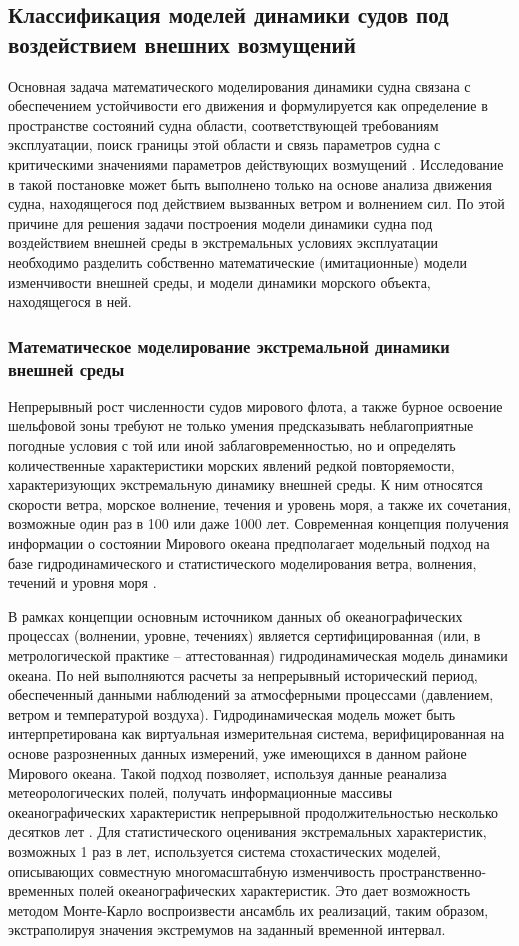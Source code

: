 \subsection{Классификация моделей динамики судов под воздействием внешних возмущений}
Основная задача математического моделирования динамики судна связана с обеспечением устойчивости его движения и формулируется как определение в пространстве состояний судна области, соответствующей требованиям эксплуатации, поиск границы этой области и связь параметров судна с критическими значениями параметров действующих возмущений \citep{dk1}. Исследование в такой постановке может быть выполнено только на основе анализа движения судна, находящегося под действием вызванных ветром и волнением сил. По этой причине для решения задачи построения модели динамики судна под воздействием внешней среды в экстремальных условиях эксплуатации необходимо разделить собственно математические (имитационные) модели изменчивости внешней среды, и модели динамики морского объекта, находящегося в ней.

\subsubsection{Математическое моделирование экстремальной динамики внешней среды}
Непрерывный рост численности судов мирового флота, а также бурное освоение шельфовой зоны требуют не только умения предсказывать неблагоприятные погодные условия с той или иной заблаговременностью, но и определять количественные характеристики морских явлений редкой повторяемости, характеризующих экстремальную динамику внешней среды. К ним относятся скорости ветра, морское волнение, течения и уровень моря, а также их сочетания, возможные один раз в 100 или даже 1000 лет. Современная концепция получения информации о состоянии Мирового океана предполагает модельный подход на базе гидродинамического и статистического моделирования ветра, волнения, течений и уровня моря \citep{dk2}.

В рамках концепции \citep{dk3} основным источником данных об океанографических процессах (волнении, уровне, течениях) является сертифицированная (или, в метрологической практике – аттестованная) гидродинамическая модель динамики океана. По ней выполняются расчеты за непрерывный исторический период, обеспеченный данными наблюдений за атмосферными процессами (давлением, ветром и температурой воздуха). Гидродинамическая модель может быть интерпретирована как виртуальная измерительная система, верифицированная на основе разрозненных данных измерений, уже имеющихся в данном районе Мирового океана. Такой подход позволяет, используя данные реанализа метеорологических полей, получать информационные массивы океанографических характеристик непрерывной продолжительностью несколько десятков лет \citep{dk4}. Для статистического оценивания экстремальных характеристик, возможных 1 раз в   лет, используется система стохастических моделей, описывающих совместную многомасштабную изменчивость пространственно-временных полей океанографических характеристик. Это дает возможность методом Монте-Карло воспроизвести ансамбль их реализаций, таким образом, экстраполируя значения экстремумов на заданный временной интервал.

